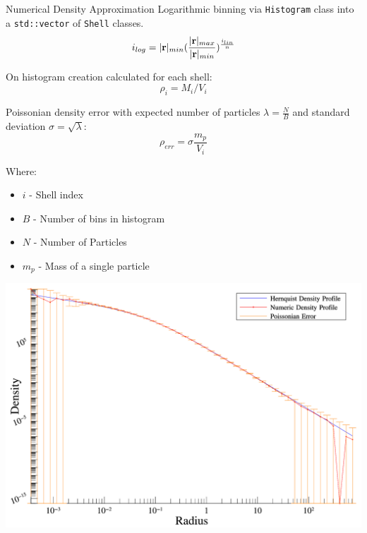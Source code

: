\begin{frame}{Numerical Density Approximation}
	Logarithmic binning via \texttt{Histogram} class into a \texttt{std::vector} of \texttt{Shell} classes.
	\begin{equation}
		i_{log} = |\vb{r}|_{min} (\frac{|\vb{r}|_{max}}{|\vb{r}|_{min}})^{\frac {i_{lin}}{n}}
	\end{equation}

	On histogram creation calculated for each shell:
	\begin{equation}
		\rho_i = M_i / V_i
	\end{equation}

	Poissonian density error with expected number of particles $\lambda = \frac{N}{B}$ and standard deviation
	$\sigma = \sqrt{\lambda}$:
	\begin{equation}
		\rho_{err} = \sigma \frac{m_p}{V_i}
	\end{equation}

	{\footnotesize
	Where:
	\begin{itemize}
		\item $i$ - Shell index
		\item $B$ - Number of bins in histogram
		\item $N$ - Number of Particles
		\item $m_p$ - Mass of a single particle
	\end{itemize}
	}
\end{frame}


\begin{frame}
	\includegraphics[width=1\textwidth]{figures/plots/hernquist.png}
\end{frame}

